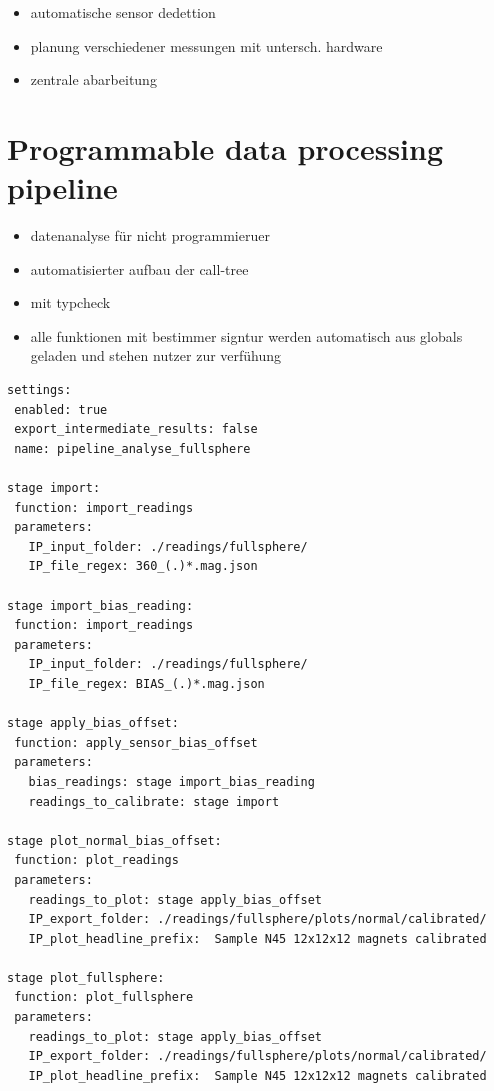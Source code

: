 \begin{itemize}
\tightlist
\item
  automatische sensor dedettion
\item
  planung verschiedener messungen mit untersch. hardware
\item
  zentrale abarbeitung
\end{itemize}

\hypertarget{programmable-data-processing-pipeline}{%
\section{Programmable data processing
pipeline}\label{programmable-data-processing-pipeline}}

\begin{itemize}
\tightlist
\item
  datenanalyse für nicht programmieruer
\item
  automatisierter aufbau der call-tree
\item
  mit typcheck
\item
  alle funktionen mit bestimmer signtur werden automatisch aus globals
  geladen und stehen nutzer zur verfühung
\end{itemize}

\begin{lstlisting}
settings:
 enabled: true
 export_intermediate_results: false
 name: pipeline_analyse_fullsphere

stage import:
 function: import_readings
 parameters:
   IP_input_folder: ./readings/fullsphere/
   IP_file_regex: 360_(.)*.mag.json

stage import_bias_reading:
 function: import_readings
 parameters:
   IP_input_folder: ./readings/fullsphere/
   IP_file_regex: BIAS_(.)*.mag.json

stage apply_bias_offset:
 function: apply_sensor_bias_offset
 parameters:
   bias_readings: stage import_bias_reading
   readings_to_calibrate: stage import

stage plot_normal_bias_offset:
 function: plot_readings
 parameters:
   readings_to_plot: stage apply_bias_offset
   IP_export_folder: ./readings/fullsphere/plots/normal/calibrated/
   IP_plot_headline_prefix:  Sample N45 12x12x12 magnets calibrated

stage plot_fullsphere:
 function: plot_fullsphere
 parameters:
   readings_to_plot: stage apply_bias_offset
   IP_export_folder: ./readings/fullsphere/plots/normal/calibrated/
   IP_plot_headline_prefix:  Sample N45 12x12x12 magnets calibrated
\end{lstlisting}

